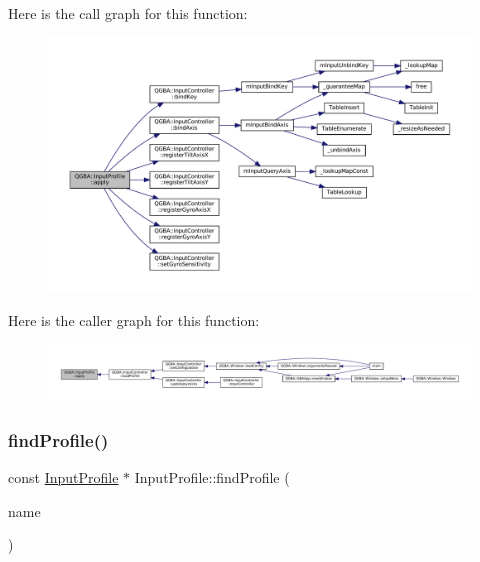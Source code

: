 Here is the call graph for this function\+:
\nopagebreak
\begin{figure}[H]
\begin{center}
\leavevmode
\includegraphics[width=350pt]{class_q_g_b_a_1_1_input_profile_af9d99ee2824bfd7fded95f73533d7f67_cgraph}
\end{center}
\end{figure}
Here is the caller graph for this function\+:
\nopagebreak
\begin{figure}[H]
\begin{center}
\leavevmode
\includegraphics[width=350pt]{class_q_g_b_a_1_1_input_profile_af9d99ee2824bfd7fded95f73533d7f67_icgraph}
\end{center}
\end{figure}
\mbox{\label{class_q_g_b_a_1_1_input_profile_ac6eae13b93ba25478a13e3a5cac69b46}} 
\subsubsection{\texorpdfstring{find\+Profile()}{findProfile()}}
{\footnotesize\ttfamily const \mbox{\hyperlink{class_q_g_b_a_1_1_input_profile}{Input\+Profile}} $\ast$ Input\+Profile\+::find\+Profile (\begin{DoxyParamCaption}\item[{const Q\+String \&}]{name }\end{DoxyParamCaption})\hspace{0.3cm}{\ttfamily [static]}}

